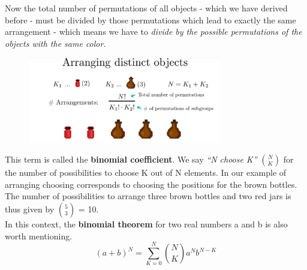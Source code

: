 \documentclass[12pt, a4paper]{scrartcl}
\begin{document}
Now the total number of permutations of all objects - which we have derived before - must be divided by those permutations which lead to exactly the same arrangement - which means we have to \textit{divide by the possible permutations of the objects with the same color}.
 \begin{figure}[H]
	\centering
	\includegraphics[width=0.75\textwidth]{4_2.png}
\end{figure}
This term is called the \textbf{binomial coefficient}. 
We say \textit{``N choose K''} ${N\choose K}$ for the number of possibilities to choose K out of N elements. In our example of arranging choosing corresponds to choosing the positions for the brown bottles. The number of possibilities to arrange three brown bottles and two red jars is thus given by ${5 \choose 3}$ = 10.\\


In this context, the \textbf{binomial theorem} for two real numbers a and b is also worth mentioning.
\begin{equation*}\boxed{(a+b)^N = \sum_{K=0}^{N}{N\choose K}a^Nb^{N-K}
}\end{equation*}\\
\\
\end{document}
